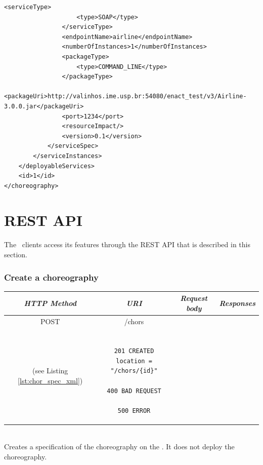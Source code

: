 {\begin{lstlisting}[breaklines, caption=Choreography XML representation example., label=lst:chor_xml]
                <serviceType>
                    <type>SOAP</type>
                </serviceType>
                <endpointName>airline</endpointName>
                <numberOfInstances>1</numberOfInstances>
                <packageType>
                    <type>COMMAND_LINE</type>
                </packageType>
                <packageUri>http://valinhos.ime.usp.br:54080/enact_test/v3/Airline-3.0.0.jar</packageUri>
                <port>1234</port>
                <resourceImpact/>
                <version>0.1</version>
            </serviceSpec>
        </serviceInstances>
    </deployableServices>
    <id>1</id>
</choreography>
\end{lstlisting}

}

\section{REST API}
\label{sec:api}

The \ee\ clients access its features through the REST API that is described in this section.

\subsubsection*{Create a choreography}

\begin{tabular}{|c|c|c|c|}
\hline 
\itshape{HTTP Method} & \itshape{URI} & \itshape{Request body} & \itshape{Responses} \\ 
\hline 
POST & /chors & 

\begin{minipage}{2in}
\verb!ChorSpec! XML representation \\ 
(see Listing \ref{lst:chor_spec_xml})
\end{minipage} 
&

\begin{minipage}{2in}
\begin{verbatim}

201 CREATED
location = "/chors/{id}"

400 BAD REQUEST

500 ERROR

\end{verbatim}
\end{minipage} 
\\ 
\hline 
\end{tabular} \\

Creates a specification of the choreography on the \ee.
It does not deploy the choreography. 

